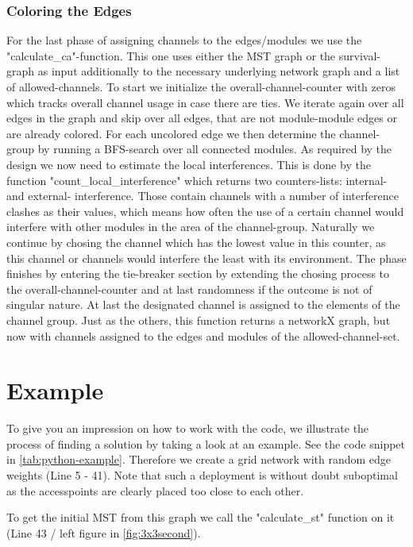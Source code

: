       \subsubsection{Coloring the Edges}
	For the last phase of assigning channels to the edges/modules we use the "calculate\_ca"-function. This one uses either the MST graph or the survival-graph as input additionally
	to the necessary underlying network graph and a list of allowed-channels.
	To start we initialize the overall-channel-counter with zeros which tracks overall channel usage in case there are ties.
	We iterate again over all edges in the graph and skip over all edges, that are not module-module edges or are already colored. 
	For each uncolored edge we then determine the channel-group by running a BFS-search over all connected modules.
	As required by the design we now need to estimate the local interferences.
	This is done by the function "count\_local\_interference" which returns two counters-lists: internal- and external- interference.
	Those contain channels with a number of interference clashes as their values, which means how often the use of a certain channel would interfere with other modules 
	in the area of the channel-group. Naturally we continue by chosing the channel which has the lowest value in this counter, as this channel or channels would interfere the least
	with its environment. The phase finishes by entering the tie-breaker section by extending the chosing process to the overall-channel-counter and at last randomness if
	the outcome is not of singular nature.
	At last the designated channel is assigned to the elements of the channel group.
	Just as the others, this function returns a networkX graph, but now with channels assigned to the edges and modules of the allowed-channel-set.	

  \section{Example}
    To give you an impression on how to work with the code, we illustrate the process of finding a solution by taking a look at an example.
    See the code snippet in \ref{tab:python-example}.
    Therefore we create a grid network with random edge weights (Line 5 - 41).
    Note that such a deployment is without doubt suboptimal as the accesspoints are clearly placed too close to each other.

    To get the initial MST from this graph we call the "calculate\_st" function on it (Line 43 / left figure in \ref{fig:3x3second}).
    
